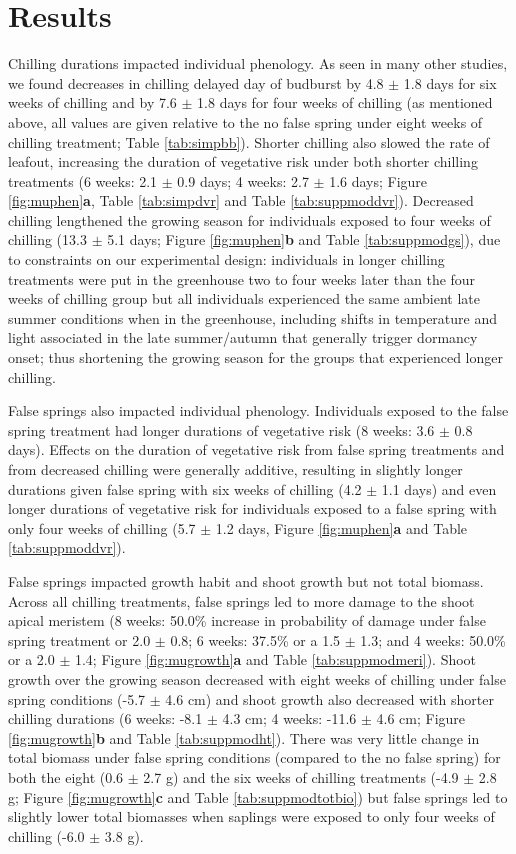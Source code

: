 \documentclass{article}\usepackage[]{graphicx}\usepackage[]{color}
\begin{document}
\section*{Results} 
Chilling durations impacted individual phenology. As seen in many other studies, we found decreases in chilling delayed day of budburst by 4.8 $\pm$ 1.8 days for six weeks of chilling and by 7.6 $\pm$ 1.8 days for four weeks of chilling (as mentioned above, all values are given relative to the no false spring under eight weeks of chilling treatment; Table \ref{tab:simpbb}). Shorter chilling also slowed the rate of leafout, increasing the duration of vegetative risk under both shorter chilling treatments (6 weeks: 2.1 $\pm$ 0.9 days; 4 weeks: 2.7 $\pm$ 1.6 days; Figure \ref{fig:muphen}\textbf{a}, Table \ref{tab:simpdvr} and Table \ref{tab:suppmoddvr}). Decreased chilling lengthened the growing season for individuals exposed to four weeks of chilling (13.3 $\pm$ 5.1 days; Figure \ref{fig:muphen}\textbf{b} and Table \ref{tab:suppmodgs}), due to constraints on our experimental design: individuals in longer chilling treatments were put in the greenhouse two to four weeks later than the four weeks of chilling group but all individuals experienced the same ambient late summer conditions when in the greenhouse, including shifts in temperature and light associated in the late summer/autumn that generally trigger dormancy onset; thus shortening the growing season for the groups that experienced longer chilling. 
 
False springs also impacted individual phenology. Individuals exposed to the false spring treatment had longer durations of vegetative risk (8 weeks: 3.6 $\pm$ 0.8 days). Effects on the duration of vegetative risk from false spring treatments and from decreased chilling were generally additive, resulting in slightly longer durations given false spring with six weeks of chilling (4.2 $\pm$ 1.1 days) and even longer durations of vegetative risk for individuals exposed to a false spring with only four weeks of chilling (5.7 $\pm$ 1.2 days, Figure \ref{fig:muphen}\textbf{a} and Table \ref{tab:suppmoddvr}).  

False springs impacted growth habit and shoot growth but not total biomass. Across all chilling treatments, false springs led to more damage to the shoot apical meristem (8 weeks: 50.0\% increase in probability of damage under false spring treatment or 2.0 $\pm$ 0.8; 6 weeks: 37.5\% or a 1.5 $\pm$ 1.3; and 4 weeks: 50.0\% or a 2.0 $\pm$ 1.4; Figure \ref{fig:mugrowth}\textbf{a} and Table \ref{tab:suppmodmeri}). Shoot growth over the growing season decreased with eight weeks of chilling under false spring conditions (-5.7 $\pm$ 4.6 cm) and shoot growth also decreased with shorter chilling durations (6 weeks: -8.1 $\pm$ 4.3 cm; 4 weeks: -11.6 $\pm$ 4.6 cm; Figure \ref{fig:mugrowth}\textbf{b} and Table \ref{tab:suppmodht}). There was very little change in total biomass under false spring conditions (compared to the no false spring) for both the eight (0.6 $\pm$ 2.7 g) and the six weeks of chilling treatments (-4.9 $\pm$ 2.8 g; Figure \ref{fig:mugrowth}\textbf{c} and Table \ref{tab:suppmodtotbio}) but false springs led to slightly lower total biomasses when saplings were exposed to only four weeks of chilling (-6.0 $\pm$ 3.8 g).
  
\end{document}
